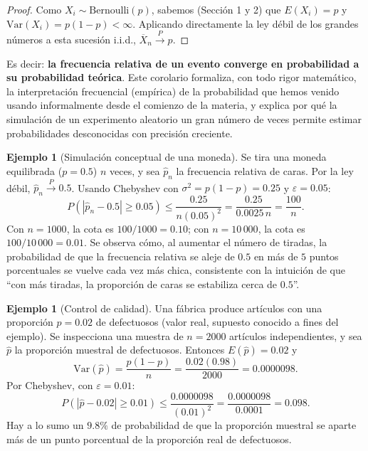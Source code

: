 \documentclass[11pt,a4paper]{article}
\theoremstyle{plain}
\theoremstyle{definition}
\newtheorem{ejemplo}[teorema]{Ejemplo}
\theoremstyle{remark}
\begin{document}
\begin{proof}
Como $X_i\sim\text{Bernoulli}(p)$, sabemos (Sección 1 y 2) que $E(X_i)=p$ y $\text{Var}(X_i)=p(1-p)<\infty$. Aplicando directamente la ley débil de los grandes números a esta sucesión i.i.d., $\overline{X}_n\xrightarrow{P}p$.
\end{proof}

Es decir: \textbf{la frecuencia relativa de un evento converge en probabilidad a su probabilidad teórica}. Este corolario formaliza, con todo rigor matemático, la interpretación frecuencial (empírica) de la probabilidad que hemos venido usando informalmente desde el comienzo de la materia, y explica por qué la simulación de un experimento aleatorio un gran número de veces permite estimar probabilidades desconocidas con precisión creciente.

\begin{ejemplo}[Simulación conceptual de una moneda]
Se tira una moneda equilibrada ($p=0.5$) $n$ veces, y sea $\hat{p}_n$ la frecuencia relativa de caras. Por la ley débil, $\hat{p}_n\xrightarrow{P}0.5$. Usando Chebyshev con $\sigma^2=p(1-p)=0.25$ y $\varepsilon=0.05$:
\[
P(|\hat{p}_n-0.5|\geq0.05) \leq \frac{0.25}{n(0.05)^2} = \frac{0.25}{0.0025\,n} = \frac{100}{n}.
\]
Con $n=1000$, la cota es $100/1000=0.10$; con $n=10\,000$, la cota es $100/10\,000=0.01$. Se observa cómo, al aumentar el número de tiradas, la probabilidad de que la frecuencia relativa se aleje de $0.5$ en más de $5$ puntos porcentuales se vuelve cada vez más chica, consistente con la intuición de que ``con más tiradas, la proporción de caras se estabiliza cerca de $0.5$''.
\end{ejemplo}

\begin{ejemplo}[Control de calidad]
Una fábrica produce artículos con una proporción $p=0.02$ de defectuosos (valor real, supuesto conocido a fines del ejemplo). Se inspecciona una muestra de $n=2000$ artículos independientes, y sea $\hat p$ la proporción muestral de defectuosos. Entonces $E(\hat p)=0.02$ y
\[
\text{Var}(\hat p) = \frac{p(1-p)}{n} = \frac{0.02(0.98)}{2000} = 0.0000098.
\]
Por Chebyshev, con $\varepsilon=0.01$:
\[
P(|\hat p-0.02|\geq0.01) \leq \frac{0.0000098}{(0.01)^2} = \frac{0.0000098}{0.0001} = 0.098.
\]
Hay a lo sumo un $9.8\%$ de probabilidad de que la proporción muestral se aparte más de un punto porcentual de la proporción real de defectuosos.
\end{ejemplo}
\end{document}
